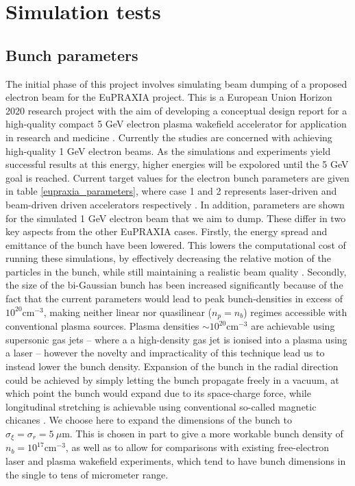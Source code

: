 \chapter{Simulation tests} %
\section{Bunch parameters}
The initial phase of this project involves simulating beam dumping of a proposed electron beam for the EuPRAXIA project. This is a European Union Horizon 2020 research project with the aim of developing a conceptual design report for a high-quality compact 5 GeV electron plasma wakefield accelerator for application in research and medicine \cite{Eupraxia}. Currently the studies are concerned with achieving high-quality 1 GeV electron beams. As the simulations and experiments yield successful results at this energy, higher energies will be expolored until the 5 GeV goal is reached. Current target values for the electron bunch parameters are given in table \ref{eupraxia_parameters}, where case 1 and 2 represents laser-driven and beam-driven driven accelerators respectively \cite{Eupraxia}.  In addition, parameters are shown for the simulated 1 GeV electron beam that we aim to dump. These differ in two key aspects from the other EuPRAXIA cases. Firstly, the energy spread and emittance of the bunch have been lowered. This lowers the computational cost of running these simulations, by effectively decreasing the relative motion of the particles in the bunch, while still maintaining a realistic beam quality \cite{Walker2017}. Secondly, the size of the bi-Gaussian bunch has been increased significantly because of the fact that the current parameters would lead to peak bunch-densities in excess of $10^{20} \text{cm}^{-3}$, making neither linear nor quasilinear ($n_p=n_b$) regimes accessible with conventional plasma sources. Plasma densities $\sim 10^{20} \text{cm}^{-3}$ are achievable using supersonic gas jets \cite{Schmid2012} -- where a a high-density gas jet is ionised into a plasma using a laser -- however the novelty and impracticality of this technique lead us to instead lower the bunch density. Expansion of the bunch in the radial direction could be achieved by simply letting the bunch propagate freely in a vacuum, at which point the bunch would expand due to its space-charge force, while longitudinal stretching is achievable using conventional so-called magnetic chicanes \cite{Maier2012}. We choose here to expand the dimensions of the bunch to $\sigma_{\xi}=\sigma_r=5~\mu\text{m}$. This is chosen in part to give a more workable bunch density of $n_b=10^{17} \text{cm}^{-3}$, as well as to allow for comparisons with existing free-electron laser and plasma wakefield experiments, which tend to have bunch dimensions in the single to tens of micrometer range. \vspace{-10pt}\\
